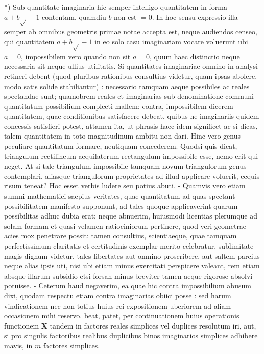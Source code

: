 \documentclass[10pt]{article}
\begin{document}
*) Sub quantitate imaginaria hic semper intelligo quantitatem in forma \(a+b \sqrt{ }-1\) contentam, quamdiu \(b\) non est \(=0\). In hoc sensu expressio illa semper ab omnibus geometris primae notae accepta est, neque audiendos censeo, qui quantitatem \(a+b \sqrt{ }-1\) in eo solo casu imaginariam vocare voluerunt ubi \(a=0\), impossibilem vero quando non sit \(a=0\), quum haec distinctio neque necessaria sit neque ullius utilitatis. Si quantitates imaginariae omnino in analysi retineri debent (quod pluribus rationibus consultius videtur, quam ipsas abolere, modo satis solide stabiliantur) : necessario tamquam aeque possibiles ac reales spectandae sunt; quamobrem reales et imaginarias sub denominatione communi quantitatum possibilium complecti mallem: contra, impossibilem dicerem quantitatem, quae conditionibus satisfacere debeat, quibus ne imaginariis quidem concessis satisfieri potest, attamen ita, ut phrasis haec idem significet ac si dicas, talem quantitatem in toto magnitudinum ambitu non dari. Hinc vero genus peculiare quantitatum formare, neutiquam concederem. Quodsi quis dicat, triangulum rectilineum aequilaterum rectangulum impossibile esse, nemo erit qui neget. At si tale triangulum impossibile tamquam novum triangulorum genus contemplari, aliasque triangulorum proprietates ad illud applicare voluerit, ecquis risum teneat? Hoc esset verbis ludere seu potius abuti. - Quamvis vero etiam summi mathematici saepius veritates, quae quantitatum ad quas spectant possibilitatem manifesto supponunt, ad tales quoque applicaverint quarum possibilitas adhuc dubia erat; neque abnuerim, huiusmodi licentias plerumque ad solam formam et quasi velamen ratiociniorum pertinere, quod veri geometrae acies mox penetrare possit: tamen consultius, scientiaeque, quae tamquam perfectissimum claritatis et certitudinis exemplar merito celebratur, sublimitate magis dignum videtur, tales libertates aut omnino proscribere, aut saltem parcius neque alias ipsis uti, nisi ubi etiam minus exercitati perspicere valeant, rem etiam absque illarum subsidio etsi forsan minus breviter tamen aeque rigorose absolvi potuisse. - Ceterum haud negaverim, ea quae hic contra impossibilium abusum dixi, quodam respectu etiam contra imaginarias obiici posse : sed harum vindicationem nec non totius huius rei expositionem uberiorem ad aliam occasionem mihi reservo.
beat, patet, per continuationem huius operationis functionem \(\boldsymbol{X}\) tandem in factores reales simplices vel duplices resolutum iri, aut, si pro singulis factoribus realibus duplicibus binos imaginarios simplices adhibere mavis, in \(m\) factores simplices.
\end{document}
